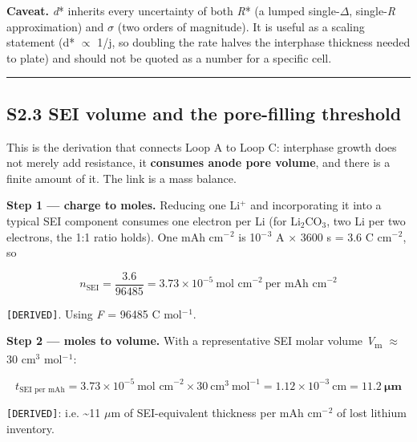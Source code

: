 \documentclass[11pt,a4paper]{article}
\begin{document}
\textbf{Caveat.} \emph{d}* inherits every uncertainty of both \emph{R}* (a lumped single-\ensuremath{\Delta}, single-\emph{R} approximation) and \ensuremath{\sigma} (two orders of magnitude). It is useful as a scaling statement (d* \ensuremath{\propto} 1/j, so doubling the rate halves the interphase thickness needed to plate) and should not be quoted as a number for a specific cell.


\par\noindent\rule{\linewidth}{0.4pt}\par


\subsection*{S2.3 SEI volume and the pore-filling threshold}


This is the derivation that connects Loop A to Loop C: interphase growth does not merely add resistance, it \textbf{consumes anode pore volume}, and there is a finite amount of it. The link is a mass balance.


\textbf{Step 1 --- charge to moles.} Reducing one Li\ensuremath{^{+}} and incorporating it into a typical SEI component consumes one electron per Li (for Li\ensuremath{_{2}}CO\ensuremath{_{3}}, two Li per two electrons, the 1:1 ratio holds). One mAh cm\ensuremath{^{-}}\ensuremath{^{2}} is 10\ensuremath{^{-}}\ensuremath{^{3}} A \ensuremath{\times} 3600 s = 3.6 C cm\ensuremath{^{-}}\ensuremath{^{2}}, so


\begin{equation}n_{\text{SEI}} = \frac{3.6}{96485} = 3.73\times10^{-5}\ \text{mol cm}^{-2}\ \text{per mAh cm}^{-2} \tag{S2.E6}\end{equation}


\texttt{[DERIVED]}. Using \emph{F} = 96485 C mol\ensuremath{^{-}}\ensuremath{^{1}}.


\textbf{Step 2 --- moles to volume.} With a representative SEI molar volume \emph{V}\textsubscript{m} \ensuremath{\approx} 30 cm\ensuremath{^{3}} mol\ensuremath{^{-}}\ensuremath{^{1}}:


\begin{equation}t_{\text{SEI per mAh}} = 3.73\times10^{-5}\ \text{mol cm}^{-2} \times 30\ \text{cm}^{3}\ \text{mol}^{-1} = 1.12\times10^{-3}\ \text{cm} = \mathbf{11.2\ \mu m} \tag{S2.E7}\end{equation}


\texttt{[DERIVED]}: i.e. \textasciitilde{}11 \ensuremath{\mu}m of SEI-equivalent thickness per mAh cm\ensuremath{^{-}}\ensuremath{^{2}} of lost lithium inventory.
\end{document}
